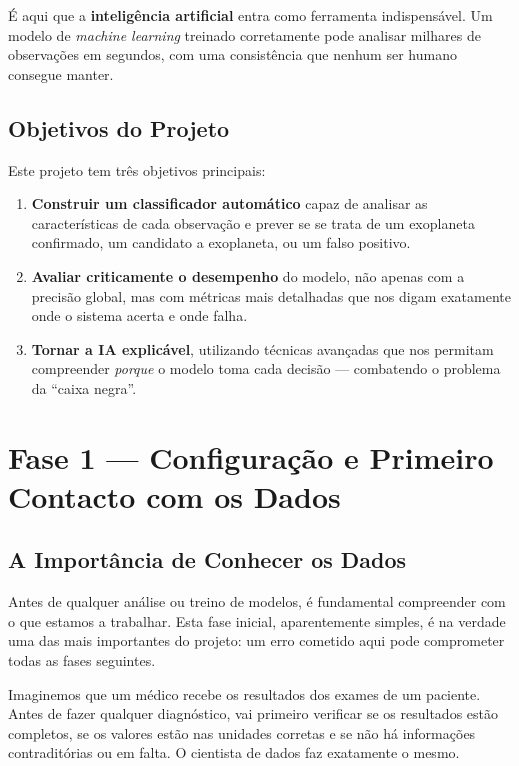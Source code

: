 \documentclass[12pt, a4paper]{report}
\begin{document}
É aqui que a \textbf{inteligência artificial} entra como ferramenta indispensável. Um modelo de \textit{machine learning} treinado corretamente pode analisar milhares de observações em segundos, com uma consistência que nenhum ser humano consegue manter.

\section{Objetivos do Projeto}

Este projeto tem três objetivos principais:

\begin{enumerate}
    \item \textbf{Construir um classificador automático} capaz de analisar as características de cada observação e prever se se trata de um exoplaneta confirmado, um candidato a exoplaneta, ou um falso positivo.

    \item \textbf{Avaliar criticamente o desempenho} do modelo, não apenas com a precisão global, mas com métricas mais detalhadas que nos digam exatamente onde o sistema acerta e onde falha.

    \item \textbf{Tornar a IA explicável}, utilizando técnicas avançadas que nos permitam compreender \textit{porque} o modelo toma cada decisão — combatendo o problema da ``caixa negra''.
\end{enumerate}

\chapter{Fase 1 — Configuração e Primeiro Contacto com os Dados}

\section{A Importância de Conhecer os Dados}

Antes de qualquer análise ou treino de modelos, é fundamental compreender com o que estamos a trabalhar. Esta fase inicial, aparentemente simples, é na verdade uma das mais importantes do projeto: um erro cometido aqui pode comprometer todas as fases seguintes.

Imaginemos que um médico recebe os resultados dos exames de um paciente. Antes de fazer qualquer diagnóstico, vai primeiro verificar se os resultados estão completos, se os valores estão nas unidades corretas e se não há informações contraditórias ou em falta. O cientista de dados faz exatamente o mesmo.
\end{document}
